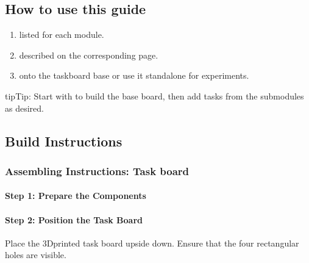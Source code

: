 \documentclass[letterpaper,10pt,english]{sphinxmanual}
\begin{document}
\subsection{How to use this guide}
\label{\detokenize{wbk_challenge_overview:how-to-use-this-guide}}\begin{enumerate}
%
\item {} 
\sphinxAtStartPar
{} listed for each module.

\item {} 
\sphinxAtStartPar
{} described on the corresponding page.

\item {} 
\sphinxAtStartPar
{} onto the taskboard base or use it stand\sphinxhyphen{}alone for experiments.

\end{enumerate}

\begin{sphinxadmonition}{tip}{Tip:}
\sphinxAtStartPar
Start with  to build the base board, then add tasks from the submodules as desired.
\end{sphinxadmonition}


\subsection{Build Instructions}
\label{\detokenize{wbk_challenge_overview:build-instructions}}
\sphinxstepscope


\subsubsection{Assembling Instructions: Task board}
\label{\detokenize{0-Assembly_Instructions_Taskboard:assembling-instructions-task-board}}\label{\detokenize{0-Assembly_Instructions_Taskboard::doc}}

\paragraph{Step 1: Prepare the Components}
\label{\detokenize{0-Assembly_Instructions_Taskboard:step-1-prepare-the-components}}

\paragraph{Step 2: Position the Task Board}
\label{\detokenize{0-Assembly_Instructions_Taskboard:step-2-position-the-task-board}}
\sphinxAtStartPar
Place the 3D\sphinxhyphen{}printed task board upside down.
Ensure that the four rectangular holes are visible.
\end{document}
